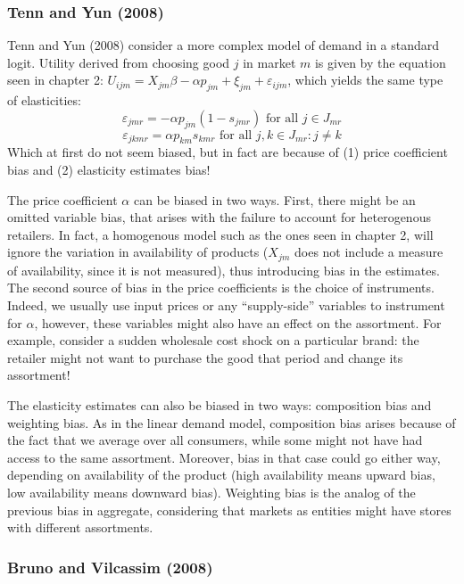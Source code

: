 \subsubsection{Tenn and Yun (2008)}

Tenn and Yun (2008) consider a more complex model of demand in a standard logit. Utility derived from choosing good $j$ in market $m$ is given by the equation seen in chapter 2: $ U_{ijm} = X_{jm}\beta - \alpha p_{jm} + \xi_{jm} + \varepsilon_{ijm} $, which yields the same type of elasticities: $$ \varepsilon_{jmr} = -\alpha p_{jm} (1 - s_{jmr}) \text{ for all } j \in J_{mr} $$ $$ \varepsilon_{jkmr} = \alpha p_{km} s_{kmr} \text{ for all } j, k \in J_{mr} : j\neq k $$
Which at first do not seem biased, but in fact are because of (1) price coefficient bias and (2) elasticity estimates bias!

The price coefficient $\alpha$ can be biased in two ways. First, there might be an omitted variable bias, that arises with the failure to account for heterogenous retailers. In fact, a homogenous model such as the ones seen in chapter 2, will ignore the variation in availability of products ($X_{jm}$ does not include a measure of availability, since it is not measured), thus introducing bias in the estimates. The second source of bias in the price coefficients is the choice of instruments. Indeed, we usually use input prices or any ``supply-side'' variables to instrument for $\alpha$, however, these variables might also have an effect on the assortment. For example, consider a sudden wholesale cost shock on a particular brand: the retailer might not want to purchase the good that period and change its assortment!

The elasticity estimates can also be biased in two ways: composition bias and weighting bias. As in the linear demand model, composition bias arises because of the fact that we average over all consumers, while some might not have had access to the same assortment. Moreover, bias in that case could go either way, depending on availability of the product (high availability means upward bias, low availability means downward bias). Weighting bias is the analog of the previous bias in aggregate, considering that markets as entities might have stores with different assortments.

\subsubsection{Bruno and Vilcassim (2008)}

